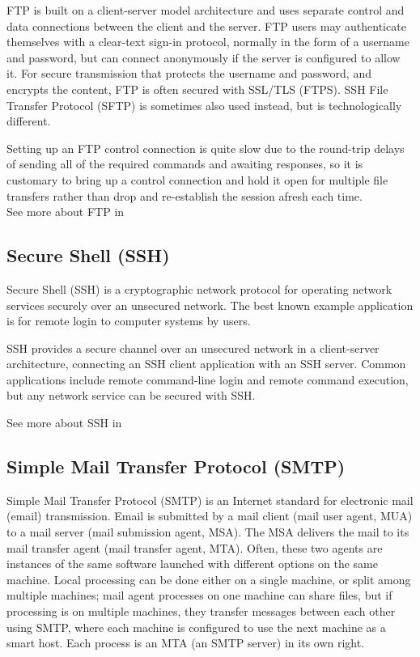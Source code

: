 FTP is built on a client-server model architecture and uses separate control and data connections between the client and the server. FTP users may authenticate themselves with a clear-text sign-in protocol, normally in the form of a username and password, but can connect anonymously if the server is configured to allow it. For secure transmission that protects the username and password, and encrypts the content, FTP is often secured with SSL/TLS (FTPS). SSH File Transfer Protocol (SFTP) is sometimes also used instead, but is technologically different.

Setting up an FTP control connection is quite slow due to the round-trip delays of sending all of the required commands and awaiting responses, so it is customary to bring up a control connection and hold it open for multiple file transfers rather than drop and re-establish the session afresh each time. \\
See more about FTP in \cite{FTP}

\subsection{Secure Shell (SSH)} 
Secure Shell (SSH) is a cryptographic network protocol for operating network services securely over an unsecured network. The best known example application is for remote login to computer systems by users.

SSH provides a secure channel over an unsecured network in a client-server architecture, connecting an SSH client application with an SSH server. Common applications include remote command-line login and remote command execution, but any network service can be secured with SSH. 

See more about SSH in \cite{SSH}

\subsection{Simple Mail Transfer Protocol (SMTP)} 
Simple Mail Transfer Protocol (SMTP) is an Internet standard for electronic mail (email) transmission. Email is submitted by a mail client (mail user agent, MUA) to a mail server (mail submission agent, MSA). The MSA delivers the mail to its mail transfer agent (mail transfer agent, MTA). Often, these two agents are instances of the same software launched with different options on the same machine. Local processing can be done either on a single machine, or split among multiple machines; mail agent processes on one machine can share files, but if processing is on multiple machines, they transfer messages between each other using SMTP, where each machine is configured to use the next machine as a smart host. Each process is an MTA (an SMTP server) in its own right.

